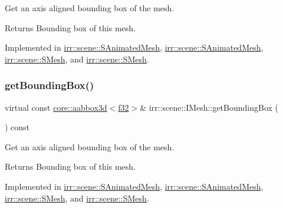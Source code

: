 Get an axis aligned bounding box of the mesh. 

\begin{DoxyReturn}{Returns}
Bounding box of this mesh. 
\end{DoxyReturn}


Implemented in \hyperlink{structirr_1_1scene_1_1SAnimatedMesh_a1494406ce8f11d47fd1e3b4af825e88f}{irr\+::scene\+::\+S\+Animated\+Mesh}, \hyperlink{structirr_1_1scene_1_1SAnimatedMesh_a1494406ce8f11d47fd1e3b4af825e88f}{irr\+::scene\+::\+S\+Animated\+Mesh}, \hyperlink{structirr_1_1scene_1_1SMesh_a379e330c863acdade37e65275903158d}{irr\+::scene\+::\+S\+Mesh}, and \hyperlink{structirr_1_1scene_1_1SMesh_a379e330c863acdade37e65275903158d}{irr\+::scene\+::\+S\+Mesh}.

\mbox{\label{classirr_1_1scene_1_1IMesh_ada6ecee9cbebed8bb67fd92872552ea0}} 
\subsubsection{\texorpdfstring{get\+Bounding\+Box()}{getBoundingBox()}\hspace{0.1cm}{\footnotesize\ttfamily [2/2]}}
{\footnotesize\ttfamily virtual const \hyperlink{classirr_1_1core_1_1aabbox3d}{core\+::aabbox3d}$<$\hyperlink{namespaceirr_a0277be98d67dc26ff93b1a6a1d086b07}{f32}$>$\& irr\+::scene\+::\+I\+Mesh\+::get\+Bounding\+Box (\begin{DoxyParamCaption}{ }\end{DoxyParamCaption}) const\hspace{0.3cm}{\ttfamily [pure virtual]}}



Get an axis aligned bounding box of the mesh. 

\begin{DoxyReturn}{Returns}
Bounding box of this mesh. 
\end{DoxyReturn}


Implemented in \hyperlink{structirr_1_1scene_1_1SAnimatedMesh_a1494406ce8f11d47fd1e3b4af825e88f}{irr\+::scene\+::\+S\+Animated\+Mesh}, \hyperlink{structirr_1_1scene_1_1SAnimatedMesh_a1494406ce8f11d47fd1e3b4af825e88f}{irr\+::scene\+::\+S\+Animated\+Mesh}, \hyperlink{structirr_1_1scene_1_1SMesh_a379e330c863acdade37e65275903158d}{irr\+::scene\+::\+S\+Mesh}, and \hyperlink{structirr_1_1scene_1_1SMesh_a379e330c863acdade37e65275903158d}{irr\+::scene\+::\+S\+Mesh}.

